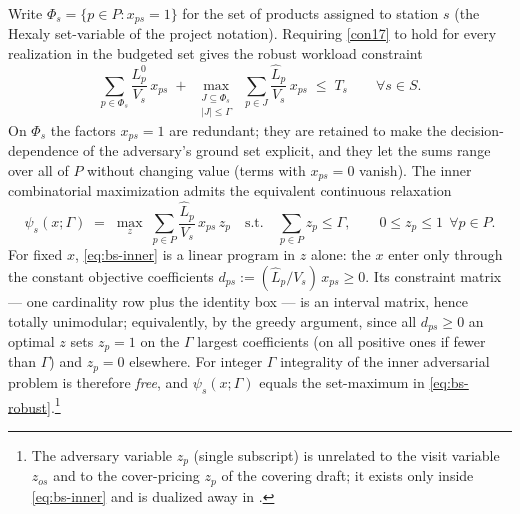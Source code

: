 Write $\Phi_s = \{p \in P : x_{ps} = 1\}$ for the set of products assigned to
station $s$ (the Hexaly set-variable of the project notation). Requiring
\eqref{con17} to hold for every realization in the budgeted set gives the
robust workload constraint
\begin{equation}
\sum_{p \in \Phi_s} \frac{L^0_p}{V_s}\, x_{ps}
\;+\;
\max_{\substack{J \subseteq \Phi_s \\ |J| \le \Gamma}}\;
\sum_{p \in J} \frac{\hat L_p}{V_s}\, x_{ps}
\;\le\; T_s
\qquad \forall s \in S.
\label{eq:bs-robust}
\end{equation}
On $\Phi_s$ the factors $x_{ps} = 1$ are redundant; they are retained to make
the decision-dependence of the adversary's ground set explicit, and they let
the sums range over all of $P$ without changing value (terms with
$x_{ps} = 0$ vanish). The inner combinatorial maximization admits the
equivalent continuous relaxation
\begin{equation}
\psi_s(x;\Gamma) \;=\; \max_{z} \;
\sum_{p \in P} \frac{\hat L_p}{V_s}\, x_{ps}\, z_p
\quad \text{s.t.} \quad
\sum_{p \in P} z_p \le \Gamma, \qquad
0 \le z_p \le 1 \ \ \forall p \in P.
\label{eq:bs-inner}
\end{equation}
For fixed $x$, \eqref{eq:bs-inner} is a linear program in $z$ alone: the $x$
enter only through the constant objective coefficients
$d_{ps} := (\hat L_p / V_s)\, x_{ps} \ge 0$. Its constraint matrix --- one
cardinality row plus the identity box --- is an interval matrix, hence totally
unimodular; equivalently, by the greedy argument, since all $d_{ps} \ge 0$ an
optimal $z$ sets $z_p = 1$ on the $\Gamma$ largest coefficients (on all
positive ones if fewer than $\Gamma$) and $z_p = 0$ elsewhere. For integer
$\Gamma$ integrality of the inner adversarial problem is therefore
\emph{free}, and $\psi_s(x;\Gamma)$ equals the set-maximum in
\eqref{eq:bs-robust}.\footnote{The adversary variable $z_p$ (single subscript)
is unrelated to the visit variable $z_{os}$ and to the cover-pricing $z_p$ of
the covering draft; it exists only inside \eqref{eq:bs-inner} and is dualized
away in .}

